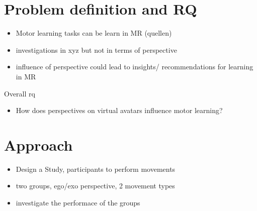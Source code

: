 \section{Problem definition and RQ}
\begin{itemize}
	\item Motor learning tasks can be learn in MR (quellen)
	\item investigations in xyz but not in terms of perspective
	\item influence of perspective could lead to insights/ recommendations for learning in MR
\end{itemize}
Overall rq
\begin{itemize}
	\item How does perspectives on virtual avatars influence motor learning?
\end{itemize}
\begin{comment}
\begin{itemize}
	\item RQ1: Does the perspective on a Virtual Avatar influence the learning performance (?better: outcome?)?
	\item RQ2: When the movement is only on a specific body part like upper body (UB), lower body (LB) or full body (FB), is there a relation between the egocentric or exocentric perspective on the avatar to the learning performance?
	\item H1: The perspective on the avatar has no influence on UB movements
	\item H2: The perspective on the avatar has no influence on LB movements
	\item H3: The perspective on the avatar has no influence on FB movements
	\item H4: The perspective on the avatar has no preferences on movement types, means the movement type has no influence on the learning performance 
\end{itemize}
\end{comment}


\section{Approach}
\begin{itemize}
	\item Design a Study, participants to perform movements
	\item two groups, ego/exo perspective, 2 movement types
	\item investigate the performace of the groups
\end{itemize}

